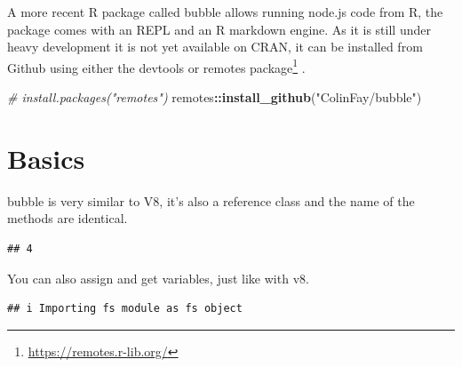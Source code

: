 \documentclass[
]{krantz}
\makeatletter
\newenvironment{Shaded}{\begin{snugshade}}{\end{snugshade}}
\newcommand{\CommentTok}[1]{\textcolor[rgb]{0.37,0.37,0.37}{\textit{#1}}}
\newcommand{\DecValTok}[1]{\textcolor[rgb]{0.06,0.06,0.06}{#1}}
\newcommand{\KeywordTok}[1]{\textcolor[rgb]{0.27,0.27,0.27}{\textbf{#1}}}
\newcommand{\NormalTok}[1]{#1}
\newcommand{\OperatorTok}[1]{\textcolor[rgb]{0.43,0.43,0.43}{\textbf{#1}}}
\newcommand{\StringTok}[1]{\textcolor[rgb]{0.5,0.5,0.5}{#1}}
\renewcommand{\href}[2]{#2\footnote{\url{#1}}}
\newenvironment{kframe}{%
\medskip{}
\setlength{\fboxsep}{.8em}
 \def\at@end@of@kframe{}%
 \ifinner\ifhmode%
  \def\at@end@of@kframe{\end{minipage}}%
  \begin{minipage}{\columnwidth}%
 \fi\fi%
 \def\FrameCommand##1{\hskip\@totalleftmargin \hskip-\fboxsep
 \colorbox{shadecolor}{##1}\hskip-\fboxsep
     \hskip-\linewidth \hskip-\@totalleftmargin \hskip\columnwidth}%
 \MakeFramed {\advance\hsize-\width
   \@totalleftmargin\z@ \linewidth\hsize
   \@setminipage}}%
 {\par\unskip\endMakeFramed%
 \at@end@of@kframe}
\renewenvironment{Shaded}{\begin{kframe}}{\end{kframe}}
\makeatother
\begin{document}
A more recent R package called bubble allows running node.js code from R, the package comes with an REPL and an R markdown engine. As it is still under heavy development it is not yet available on CRAN, it can be installed from Github using either the devtools or \href{https://remotes.r-lib.org/}{remotes package} \citep{R-remotes}.

\begin{Shaded}
\begin{Highlighting}[]
\CommentTok{\# install.packages("remotes")}
\NormalTok{remotes}\OperatorTok{::}\KeywordTok{install\_github}\NormalTok{(}\StringTok{"ColinFay/bubble"}\NormalTok{)}
\end{Highlighting}
\end{Shaded}

\hypertarget{basics-2}{%
\section*{Basics}\label{basics-2}}


bubble is very similar to V8, it's also a reference class and the name of the methods are identical.

\begin{Shaded}
\end{Shaded}

\begin{verbatim}
## 4
\end{verbatim}

You can also assign and get variables, just like with v8.

\begin{Shaded}
\end{Shaded}

\begin{verbatim}
## i Importing fs module as fs object
\end{verbatim}
\end{document}

